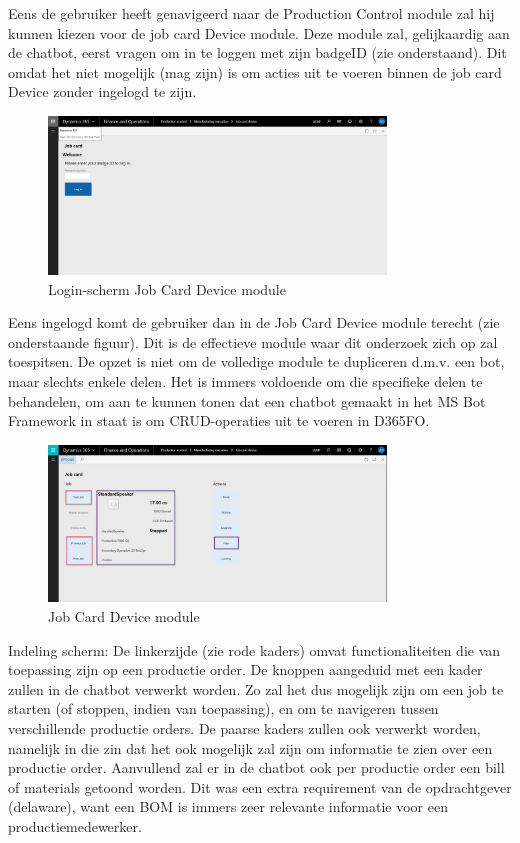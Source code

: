 Eens de gebruiker heeft genavigeerd naar de Production Control module zal hij kunnen kiezen voor de job card Device module. Deze module zal, gelijkaardig aan de chatbot, eerst vragen om in te loggen met zijn badgeID (zie onderstaand). Dit omdat het niet mogelijk (mag zijn) is om acties uit te voeren binnen de job card Device zonder ingelogd te zijn. 

\begin{figure}[H]
    \centering
    \includegraphics[width=0.8\textwidth]{img/d365productionControl3.png}
    \caption{Login-scherm Job Card Device module}
\end{figure}

Eens ingelogd komt de gebruiker dan in de Job Card Device module terecht (zie onderstaande figuur). Dit is de effectieve module waar dit onderzoek zich op zal toespitsen. De opzet is niet om de volledige module te dupliceren d.m.v. een bot, maar slechts enkele delen. Het is immers voldoende om die specifieke delen te behandelen, om aan te kunnen tonen dat een chatbot gemaakt in het MS Bot Framework in staat is om CRUD-operaties uit te voeren in D365FO. 
\begin{figure}[h]
    \centering
    \includegraphics[width=0.8\textwidth]{img/d365productionControl4.png}
    \caption{Job Card Device module}
\end{figure}
Indeling scherm: De linkerzijde (zie rode kaders) omvat functionaliteiten die van toepassing zijn op een productie order. De knoppen aangeduid met een kader zullen in de chatbot verwerkt worden. Zo zal het dus mogelijk zijn om een job te starten (of stoppen, indien van toepassing), en om te navigeren tussen verschillende productie orders. De paarse kaders zullen ook verwerkt worden, namelijk in die zin dat het ook mogelijk zal zijn om informatie te zien over een productie order. Aanvullend zal er in de chatbot ook per productie order een bill of materials getoond worden. Dit was een extra requirement van de opdrachtgever (delaware), want een BOM is immers zeer relevante informatie voor een productiemedewerker. 


